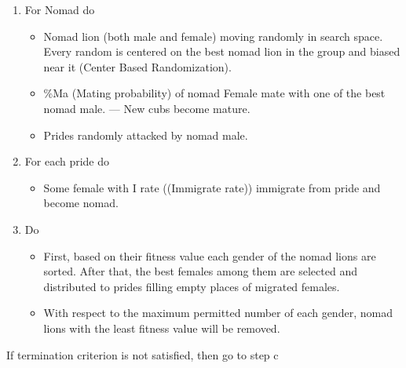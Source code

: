 {\begin{minipage}{0.9\textwidth}
\begin{enumerate}
\begin{itemize}
      \item Weakest male drive out from pride and checked whether it is within the lower bound fitness of nomads.
      \begin{itemize}
        \item Joins nomads, otherwise, killed (Simulated Annealing)
      \end{itemize}
    \end{itemize}
  \item For Nomad do
    \begin{itemize}
      \item Nomad lion (both male and female) moving randomly in search space. Every random is centered on the best nomad lion in the group and biased near it (Center Based Randomization).
      \item \%Ma (Mating probability) of nomad Female mate with one of the best nomad male. — New cubs become mature.
      \item Prides randomly attacked by nomad male.
    \end{itemize}
  \item For each pride do
    \begin{itemize}
      \item Some female with I rate ((Immigrate rate)) immigrate from pride and become nomad.
    \end{itemize}
  \item Do
    \begin{itemize}
      \item First, based on their fitness value each gender of the nomad lions are sorted. After that, the best females among them are selected and distributed to prides filling empty places of migrated females.
      \item With respect to the maximum permitted number of each gender, nomad lions with the least fitness value will be removed.
    \end{itemize}
\end{enumerate}
If termination criterion is not satisfied, then go to step c
\end{minipage}}
